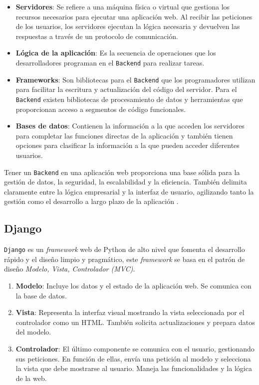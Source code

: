\begin{itemize}
    \item \textbf{Servidores}:
     Se refiere a una máquina física o virtual que gestiona los recursos necesarios para ejecutar una aplicación web. Al recibir las peticiones de los usuarios, los servidores ejecutan la lógica necesaria y devuelven las respuestas a través de un protocolo de comunicación.

     \item \textbf{Lógica de la aplicación}:
     Es la secuencia de operaciones que los desarrolladores programan en el \texttt{Backend} para realizar tareas.

     \item \textbf{Frameworks}:
     Son bibliotecas para el \texttt{Backend} que los programadores utilizan para facilitar la escritura y actualización del código del servidor. Para el \texttt{Backend} existen bibliotecas de procesamiento de datos y herramientas que proporcionan acceso a segmentos de código funcionales.

    \item \textbf{Bases de datos}:
    Contienen la información a la que acceden los servidores para completar las funciones directas de la aplicación y también tienen opciones para clasificar la información a la que pueden acceder diferentes usuarios.
\end{itemize}

Tener un \texttt{Backend} en una aplicación  web proporciona una base sólida para la gestión de datos, la seguridad, la escalabilidad y la eficiencia. También delimita claramente entre la lógica empresarial y la interfaz de usuario, agilizando tanto la gestión como el desarrollo a largo plazo de la aplicación \cite{baker2022secure}.

\subsection{Django}
\texttt{Django} es un \textit{framework} web de Python de alto nivel que fomenta el desarrollo rápido y el diseño limpio y pragmático, este \textit{framework} se basa en el patrón de diseño \textit{Modelo, Vista, Controlador (MVC)}.

\begin{enumerate}
  \item \textbf{Modelo}:  Incluye los datos y el estado de la aplicación web. Se comunica con la base de datos.
  \item \textbf{Vista}: Representa la interfaz visual mostrando la vista seleccionada por el controlador como un HTML. También solicita actualizaciones y prepara datos del modelo.
  \item \textbf{Controlador}: El último componente se comunica con el usuario, gestionando sus peticiones. En función de ellas, envía una petición al modelo y selecciona la vista que debe mostrarse al usuario. Maneja las funcionalidades y la lógica de la web.
\end{enumerate}

